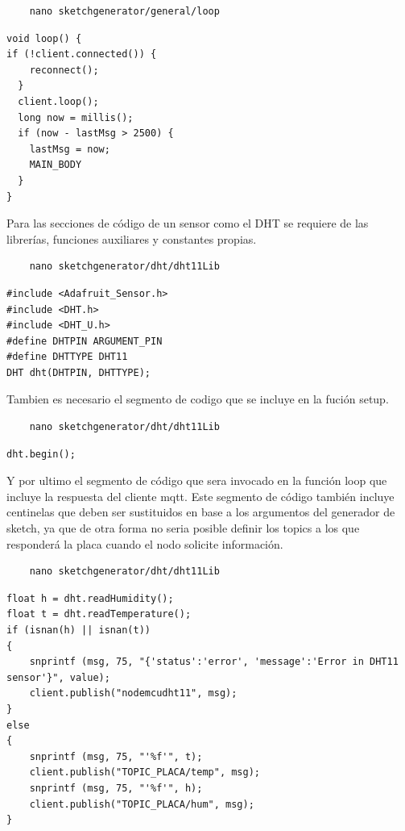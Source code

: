\begin{verbatim}
    nano sketchgenerator/general/loop
\end{verbatim}

\begin{verbatim}
void loop() {
if (!client.connected()) {
    reconnect();
  }
  client.loop();
  long now = millis();
  if (now - lastMsg > 2500) {
    lastMsg = now;
    MAIN_BODY
  }
}
\end{verbatim}

Para las secciones de código de un sensor como el DHT se requiere de las librerías, funciones auxiliares y constantes propias.
\begin{verbatim}
    nano sketchgenerator/dht/dht11Lib
\end{verbatim}

\begin{verbatim}
#include <Adafruit_Sensor.h>
#include <DHT.h>
#include <DHT_U.h>
#define DHTPIN ARGUMENT_PIN
#define DHTTYPE DHT11
DHT dht(DHTPIN, DHTTYPE);
\end{verbatim}

Tambien es necesario el segmento de codigo que se incluye en la fución setup.
\begin{verbatim}
    nano sketchgenerator/dht/dht11Lib
\end{verbatim}

\begin{verbatim}
dht.begin();
\end{verbatim}

Y por ultimo el segmento de código que sera invocado en la función loop que incluye la respuesta del cliente \gls{mqtt}. Este segmento de código también incluye centinelas que deben ser sustituidos en base a los argumentos del generador de \gls{sketch}, ya que de otra forma no seria posible definir los topics a los que responderá la placa cuando el nodo solicite información.
\begin{verbatim}
    nano sketchgenerator/dht/dht11Lib
\end{verbatim}

\begin{verbatim}
float h = dht.readHumidity();
float t = dht.readTemperature();
if (isnan(h) || isnan(t))
{
    snprintf (msg, 75, "{'status':'error', 'message':'Error in DHT11 sensor'}", value);
    client.publish("nodemcudht11", msg);
}
else
{
    snprintf (msg, 75, "'%f'", t);
    client.publish("TOPIC_PLACA/temp", msg);
    snprintf (msg, 75, "'%f'", h);
    client.publish("TOPIC_PLACA/hum", msg);
}
\end{verbatim}


